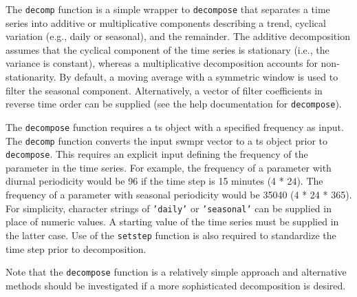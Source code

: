 \documentclass[10pt,letterpaper]{article}\usepackage[]{graphicx}\usepackage[]{color}
\newenvironment{knitrout}{}{} %
\begin{document}
\begin{knitrout}
{}



\end{knitrout}

The \texttt{decomp} function is a simple wrapper to \texttt{decompose} that separates a time series into additive or multiplicative components describing a trend, cyclical variation (e.g., daily or seasonal), and the remainder.  The additive decomposition assumes that the cyclical component of the time series is stationary (i.e., the variance is constant), whereas a multiplicative decomposition accounts for non-stationarity.  By default, a moving average with a symmetric window is used to filter the seasonal component.  Alternatively, a vector of filter coefficients in reverse time order can be supplied (see the help documentation for \texttt{decompose}).  

The \texttt{decompose} function requires a ts object with a specified frequency as input.  The \texttt{decomp} function converts the input swmpr vector to a ts object prior to \texttt{decompose}.  This requires an explicit input defining the frequency of the parameter in the time series.  For example, the frequency of a parameter with diurnal periodicity would be 96 if the time step is 15 minutes (4 * 24).  The frequency of a parameter with seasonal periodicity would be 35040 (4 * 24 * 365).  For simplicity, character strings of \texttt{'daily'} or \texttt{'seasonal'} can be supplied in place of numeric values.  A starting value of the time series must be supplied in the latter case.  Use of the \texttt{setstep} function is also required to standardize the time step prior to decomposition.  

Note that the \texttt{decompose} function is a relatively simple approach and alternative methods should be investigated if a more sophisticated decomposition is desired.
\end{document}
